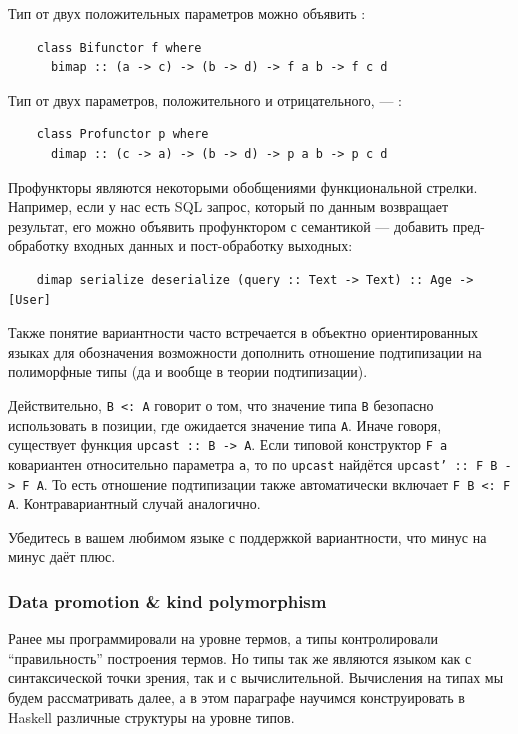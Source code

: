 Тип от двух положительных параметров можно объявить :
\begin{verbatim}
    class Bifunctor f where
      bimap :: (a -> c) -> (b -> d) -> f a b -> f c d
\end{verbatim}

Тип от двух параметров, положительного и отрицательного, --- :
\begin{verbatim}
    class Profunctor p where
      dimap :: (c -> a) -> (b -> d) -> p a b -> p c d
\end{verbatim}

Профункторы являются некоторыми обобщениями функциональной стрелки.
Например, если у нас есть SQL запрос, который по данным возвращает результат, его можно объявить профунктором с семантикой --- добавить пред-обработку входных данных и пост-обработку выходных:
\begin{verbatim}
    dimap serialize deserialize (query :: Text -> Text) :: Age -> [User]
\end{verbatim}

Также понятие вариантности часто встречается в объектно ориентированных языках для обозначения возможности дополнить отношение подтипизации на полиморфные типы (да и вообще в теории подтипизации).

Действительно,  \texttt{B <: A} говорит о том, что значение типа \texttt{B} безопасно использовать в позиции, где ожидается значение типа \texttt{A}.
Иначе говоря, существует функция \texttt{upcast :: B -> A}.
Если типовой конструктор \texttt{F a} ковариантен относительно параметра \texttt{a}, то по \texttt{upcast} найдётся \texttt{upcast' :: F B -> F A}.
То есть отношение подтипизации также автоматически включает \texttt{F B <: F A}.
Контравариантный случай аналогично.

\begin{task}
    Убедитесь в вашем любимом языке с поддержкой вариантности, что минус на минус даёт плюс.
\end{task}

\subsubsection{Data promotion \& kind polymorphism} \label{subsubsec:promotion}

Ранее мы программировали на уровне термов, а типы контролировали ``правильность'' построения термов.
Но типы так же являются языком как с синтаксической точки зрения, так и с вычислительной.
Вычисления на типах мы будем рассматривать далее, а в этом параграфе научимся конструировать в Haskell различные структуры на уровне типов.

